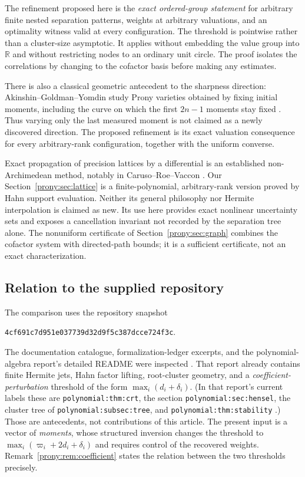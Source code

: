\documentclass[11pt,letterpaper]{article}
\theoremstyle{definition}
\theoremstyle{remark}
\newcommand{\R}{\mathbb R}
\newcommand{\lbl}[1]{\nolinkurl{#1}}%
\begin{document}
The refinement proposed here is the \emph{exact ordered-group statement}
for arbitrary finite nested separation patterns, weights at arbitrary
valuations, and an optimality witness valid at every configuration. The
threshold is pointwise rather than a cluster-size asymptotic. It applies
without embedding the value group into $\R$ and without restricting nodes
to an ordinary unit circle. The proof isolates the correlations by changing
to the cofactor basis before making any estimates.


There is also a classical geometric antecedent to the sharpness direction:
Akinshin--Goldman--Yomdin study Prony varieties obtained by fixing initial
moments, including the curve on which the first $2n-1$ moments stay fixed
\cite{AGY}. Thus varying only the last measured moment is not claimed as
a newly discovered direction. The proposed refinement is its exact
valuation consequence for every arbitrary-rank configuration, together
with the uniform converse.

Exact propagation of precision lattices by a differential is an established
non-Archimedean method, notably in Caruso--Roe--Vaccon \cite{CRV}. Our
Section~\ref{prony:sec:lattice} is a finite-polynomial, arbitrary-rank version
proved by Hahn support evaluation. Neither its general philosophy nor
Hermite interpolation is claimed as new. Its use here provides exact
nonlinear uncertainty sets and exposes a cancellation invariant not
recorded by the separation tree alone. The nonuniform certificate of
Section~\ref{prony:sec:graph} combines the cofactor system with directed-path
bounds; it is a sufficient certificate, not an exact characterization.

\subsection{Relation to the supplied repository}
\label{prony:subsec:repository}
The comparison uses the repository snapshot
\begin{center}
\texttt{4cf691c7d951e037739d32d9f5c387dcce724f3c}.
\end{center}
The documentation catalogue, formalization-ledger excerpts, and the
polynomial-algebra report's detailed README were inspected \cite{Repo}.
That report already contains finite Hermite jets, Hahn factor lifting,
root-cluster geometry, and a \emph{coefficient-perturbation} threshold of
the form $\max_i(d_i+\delta_i)$. (In that report's current labels these are
\lbl{polynomial:thm:crt}, the section \lbl{polynomial:sec:hensel}, the
cluster tree of \lbl{polynomial:subsec:tree}, and
\lbl{polynomial:thm:stability} \cite{RepoPoly}.) Those are antecedents, not
contributions of this
article. The present input is a vector of \emph{moments}, whose structured
inversion changes the threshold to
$\max_i(\varpi_i+2d_i+\delta_i)$ and requires control of the recovered weights.
Remark~\ref{prony:rem:coefficient} states the relation between the two
thresholds precisely.
\end{document}
